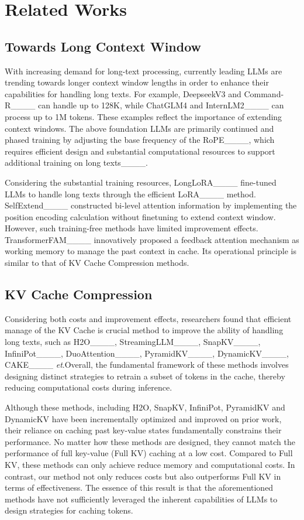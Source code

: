 \section{Related Works}
\subsection{Towards Long Context Window}
With increasing demand for long-text processing, currently leading LLMs are trending towards longer context window lengths in order to enhance their capabilities for handling long texts. For example, DeepseekV3 and Command-R____ can handle up to 128K, while ChatGLM4 and InternLM2____ can process up to 1M tokens. These examples reflect the importance of extending context windows. The above foundation LLMs are primarily continued and phased training by adjusting the base frequency of the RoPE____, which requires efficient design and substantial computational resources to support additional training on long texts____.

Considering the substantial training resources, LongLoRA____ fine-tuned LLMs to handle long texts through the efficient LoRA____ method. SelfExtend____ constructed bi-level attention information by implementing the position encoding calculation without finetuning to extend context window. However, such training-free methods have limited improvement effects. TransformerFAM____ innovatively proposed a feedback attention mechanism as working memory to manage the past context in cache. Its operational principle is similar to that of KV Cache Compression methods.

\subsection{KV Cache Compression}
Considering both costs and improvement effects, researchers found that efficient manage of the KV Cache is crucial method to improve the ability of handling long texts, such as H2O____, StreamingLLM____, SnapKV____, InfiniPot____, DuoAttention____, PyramidKV____, DynamicKV____, CAKE____ \textit{et}.Overall, the fundamental framework of these methods involves designing distinct strategies to retrain a subset of tokens in the cache, thereby reducing computational costs during inference.

Although these methods, including H2O, SnapKV, InfiniPot, PyramidKV and DynamicKV have been incrementally optimized and improved on prior work, their reliance on caching past key-value states fundamentally constrains their performance. No matter how these methods are designed, they cannot match the performance of full key-value (Full KV) caching at a low cost. Compared to Full KV, these methods can only achieve reduce memory and computational costs. In contrast, our method not only reduces costs but also outperforms Full KV in terms of effectiveness. The essence of this result is that the aforementioned methods have not sufficiently leveraged the inherent capabilities of LLMs to design strategies for caching tokens.

